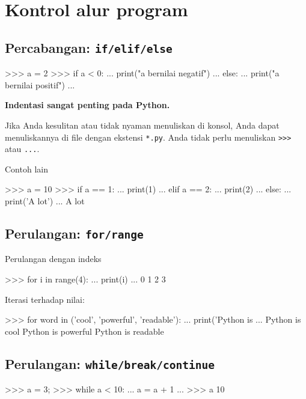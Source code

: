 \documentclass[a4paper,11pt]{extarticle}
\begin{document}
\section{Kontrol alur program}

\subsection{Percabangan: \texttt{if/elif/else}}
  
\begin{pyconcode}
>>> a = 2
>>> if a < 0:
...     print("a bernilai negatif")
... else:
...     print("a bernilai positif")
... 
\end{pyconcode}


\textbf{Indentasi sangat penting pada Python.}

Jika Anda kesulitan atau tidak nyaman menuliskan di konsol, Anda
dapat menuliskannya di file dengan ekstensi \texttt{*.py}.
Anda tidak perlu menuliskan \verb|>>>| atau \verb|...|.

Contoh lain
\begin{pyconcode}
>>> a = 10 
>>> if a == 1:
...     print(1)
... elif a == 2:
...     print(2)
... else:
...     print('A lot')
... 
A lot
\end{pyconcode}


\subsection{Perulangan: \texttt{for/range}}

Perulangan dengan indeks
\begin{pyconcode}
>>> for i in range(4):
...     print(i)
... 
0
1
2
3
\end{pyconcode}

Iterasi terhadap nilai:
\begin{pyconcode}
>>> for word in ('cool', 'powerful', 'readable'):
...     print('Python is %
...
Python is cool
Python is powerful
Python is readable
\end{pyconcode}

\subsection{Perulangan: \texttt{while/break/continue}}

\begin{pyconcode}
>>> a = 3;
>>> while a < 10:
...     a = a + 1
... 
>>> a
10
\end{pyconcode}
\end{document}
